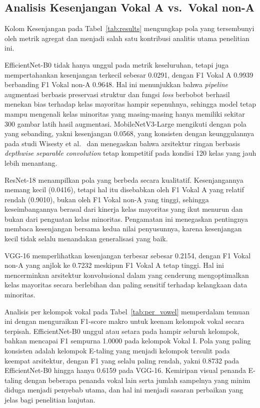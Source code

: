 \documentclass[conference]{IEEEtran}
\begin{document}
\subsection{Analisis Kesenjangan Vokal A vs.\ Vokal non-A}

Kolom Kesenjangan pada Tabel~\ref{tab:results} mengungkap pola
yang tersembunyi oleh metrik agregat dan menjadi salah satu
kontribusi analitis utama penelitian ini.

EfficientNet-B0 tidak hanya unggul pada metrik keseluruhan, tetapi
juga mempertahankan kesenjangan terkecil sebesar 0.0291, dengan F1
Vokal A 0.9939 berbanding F1 Vokal non-A 0.9648.
Hal ini menunjukkan bahwa \textit{pipeline} augmentasi berbasis
preservasi struktur dan fungsi \textit{loss} berbobot berhasil
menekan bias terhadap kelas mayoritas hampir sepenuhnya, sehingga
model tetap mampu mengenali kelas minoritas yang masing-masing hanya
memiliki sekitar 300 gambar latih hasil augmentasi.
MobileNetV3-Large mengikuti dengan pola yang sebanding, yakni
kesenjangan 0.0568, yang konsisten dengan keunggulannya pada studi
Wisesty et al.~\cite{wisesty2026} dan menegaskan bahwa arsitektur
ringan berbasis \textit{depthwise separable convolution} tetap
kompetitif pada kondisi 120 kelas yang jauh lebih menantang.

ResNet-18 menampilkan pola yang berbeda secara kualitatif.
Kesenjangannya memang kecil (0.0416), tetapi hal itu disebabkan oleh
F1 Vokal A yang relatif rendah (0.9010), bukan oleh F1 Vokal non-A
yang tinggi, sehingga keseimbangannya berasal dari kinerja kelas
mayoritas yang ikut menurun dan bukan dari penguatan kelas minoritas.
Pengamatan ini menegaskan pentingnya membaca kesenjangan bersama
kedua nilai penyusunnya, karena kesenjangan kecil tidak selalu
menandakan generalisasi yang baik.

VGG-16 memperlihatkan kesenjangan terbesar sebesar 0.2154, dengan
F1 Vokal non-A yang anjlok ke 0.7232 meskipun F1 Vokal A tetap tinggi.
Hal ini mencerminkan arsitektur konvolusional dalam yang cenderung
mengoptimalkan kelas mayoritas secara berlebihan dan paling sensitif
terhadap kelangkaan data minoritas.

Analisis per kelompok vokal pada Tabel~\ref{tab:per_vowel}
memperdalam temuan ini dengan menguraikan F1-score makro untuk
keenam kelompok vokal secara terpisah.
EfficientNet-B0 unggul atau setara pada hampir seluruh kelompok,
bahkan mencapai F1 sempurna 1.0000 pada kelompok Vokal I.
Pola yang paling konsisten adalah kelompok E-taling yang menjadi
kelompok tersulit pada keempat arsitektur, dengan F1 yang selalu
paling rendah, yakni 0.8732 pada EfficientNet-B0 hingga hanya
0.6159 pada VGG-16.
Kemiripan visual penanda E-taling dengan beberapa penanda vokal
lain serta jumlah sampelnya yang minim diduga menjadi penyebab
utama, dan hal ini menjadi sasaran perbaikan yang jelas bagi
penelitian lanjutan.
\end{document}
